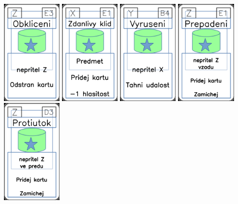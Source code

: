 \documentclass[a4paper]{article}
\begin{document}
	\includegraphics[width=3.0cm]{img-5_52}
	\includegraphics[width=3.0cm]{img-5_20}
	\includegraphics[width=3.0cm]{img-5_38}
	\includegraphics[width=3.0cm]{img-5_50}
	\includegraphics[width=3.0cm]{img-5_47}
\end{document}
